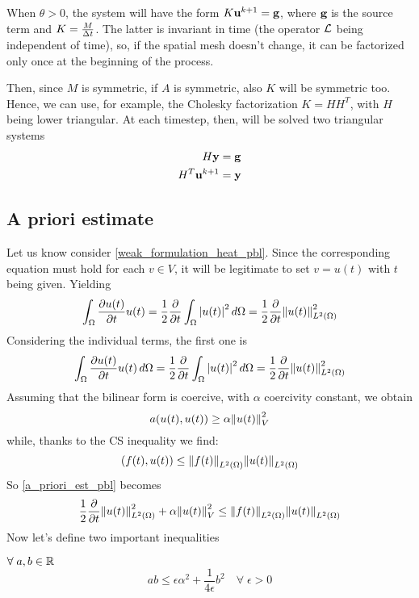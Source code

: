 When \(\theta > 0\), the system will have the form \(K\textbf{u}^{k+1} = \textbf{g}\), where \(\textbf{g}\) is the source term and \(K = \frac{M}{\Delta t}\). The latter is invariant in time (the operator \(\mathcal{L}\) being independent of time), so, if the spatial mesh doesn't change, it can be factorized only once at the beginning of the process. 

Then, since \(M\) is symmetric, if \(A\) is symmetric, also \(K\) will be symmetric too. Hence, we can use, for example, the Cholesky factorization \(K = HH^T\), with \(H\) being lower triangular. At each timestep, then, will be solved two triangular systems 
\begin{align*}
    H\textbf{y} &= \textbf{g} \\
    H^T \textbf{u}^{k+1} &= \textbf{y}
\end{align*}
\subsection{A priori estimate}
Let us know consider \eqref{weak_formulation_heat_pbl}. Since the corresponding equation must hold for each \(v \in V\), it will be legitimate to set \(v = u(t)\) with \(t\) being given. Yielding 
\begin{equation}
    \int_\Omega \partialderivative{u(t)}{t} u(t) = \frac{1}{2}\partialderivative{\null}{t} \int_\Omega \abs{u(t)}^2 \, d\Omega = \frac{1}{2} \partialderivative{\null}{t} \ltwonorm{u(t)}^2
    \label{a_priori_est_pbl}
\end{equation}
Considering the individual terms, the first one is 
\begin{equation}
    \int_\Omega \partialderivative{u(t)}{t} u(t) \, d\Omega = \onehalf \partialderivative{\null}{t} \int_\Omega \abs{u(t)}^2 \, d\Omega = \onehalf \partialderivative{\null}{t} \ltwonorm{u(t)}^2
    \label{first_term_est_pbl}
\end{equation}
Assuming that the bilinear form is coercive, with \(\alpha\) coercivity constant, we obtain 
\[
    a(u(t), u(t)) \geq \alpha \norm{u(t)}^2_V
\]
while, thanks to the CS inequality we find:
\begin{equation}
    (f(t), u(t)) \leq \norm{f(t)}_{L^2(\Omega)}\norm{u(t)}_{L^2(\Omega)}
    \label{CS_inequality_pbl}
\end{equation}
So \eqref{a_priori_est_pbl} becomes 
\[
    \frac{1}{2} \partialderivative{\null}{t} \ltwonorm{u(t)}^2 + \alpha \norm{u(t)}_V^2 \leq \ltwonorm{f(t)}\ltwonorm{u(t)}
\] 
Now let's define two important inequalities 
\begin{definition}
    \(\forall \; a, b \in \mathbb{R}\)
    \begin{equation}
        ab \leq \epsilon\alpha^2 + \frac{1}{4\epsilon} b^2 \quad \forall \; \epsilon >0 \label{young_inequality_pbl}
    \end{equation}
\end{definition}

